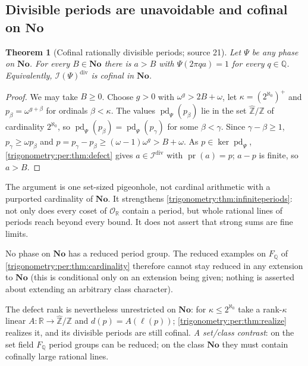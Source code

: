 \documentclass[11pt,letterpaper]{article}
\numberwithin{equation}{section}
\newtheorem{theorem}{Theorem}[section]
\theoremstyle{definition}
\theoremstyle{remark}
\newcommand{\No}{\mathbf{No}}
\newcommand{\R}{\mathbb R}
\newcommand{\Q}{\mathbb Q}
\newcommand{\Z}{\mathbb Z}
\newcommand{\OO}{\mathcal O}
\newcommand{\pr}{\operatorname{pr}}
\newcommand{\pd}{\operatorname{pd}}
\newcommand{\Zhat}{\widehat{\Z}}
\newcommand{\cI}{\mathcal I}
\begin{document}
\subsection{Divisible periods are unavoidable and cofinal on \texorpdfstring{$\No$}{No}}
\label{trigonometry:per:sec:cofinal}
\begin{theorem}[Cofinal rationally divisible periods; source 21]\label{trigonometry:per:thm:cofinal}
Let $\Psi$ be any phase on $\No$. For every $B\in\No$ there is $a>B$ with $\Psi(2\pi qa)=1$ for every
$q\in\Q$. Equivalently, $\cI(\Psi)^{\mathrm{div}}$ is cofinal in $\No$.
\end{theorem}
\begin{proof}
We may take $B\ge0$. Choose $g>0$ with $\omega^g>2B+\omega$, let $\kappa=(2^{\aleph_0})^+$ and
$p_\beta=\omega^{g+\beta}$ for ordinals $\beta<\kappa$. The values $\pd_\Psi(p_\beta)$ lie in the set
$\Zhat/\Z$ of cardinality $2^{\aleph_0}$, so $\pd_\Psi(p_\beta)=\pd_\Psi(p_\gamma)$ for some
$\beta<\gamma$. Since $\gamma-\beta\ge1$, $p_\gamma\ge\omega p_\beta$ and
$p=p_\gamma-p_\beta\ge(\omega-1)\omega^g>B+\omega$. As $p\in\ker\pd_\Psi$,
\cref{trigonometry:per:thm:defect} gives $a\in\cI^{\mathrm{div}}$ with $\pr(a)=p$; $a-p$ is finite,
so $a>B$.
\end{proof}
The argument is one set-sized pigeonhole, not cardinal arithmetic with a purported cardinality of
$\No$. It strengthens \cref{trigonometry:thm:infiniteperiods}: not only does every coset of $\OO_{\R}$
contain a period, but whole rational lines of periods reach beyond every bound. It does not assert
that strong sums are fine limits.

\begin{corollary}\label{trigonometry:per:cor:noreduced}
No phase on $\No$ has a reduced period group. The reduced examples on $F_{\Q}$ of
\cref{trigonometry:per:thm:cardinality} therefore cannot stay reduced in any extension to $\No$
(this is conditional only on an extension being given; nothing is asserted about extending an
arbitrary class character).
\end{corollary}
The defect rank is nevertheless unrestricted on $\No$: for $\kappa\le2^{\aleph_0}$ take a rank-$\kappa$
linear $A:\R\to\Zhat/\Z$ and $d(p)=A(\ell(p))$; \cref{trigonometry:per:thm:realize} realizes it, and
its divisible periods are still cofinal. \emph{A set/class contrast}: on the set field $F_{\Q}$ period
groups can be reduced; on the class $\No$ they must contain cofinally large rational lines.
\end{document}
